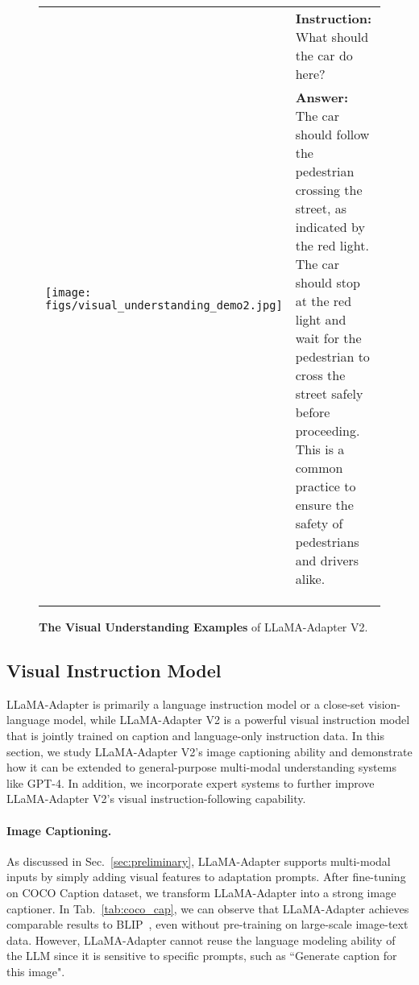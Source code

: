 \documentclass[10pt,twocolumn,letterpaper]{article}
\begin{document}
\begin{figure*}[th]
{\begin{tabular}{ll}
\multirow{2}{*}{
\texttt{[image: figs/visual\_understanding\_demo2.jpg]}
} & \begin{minipage}[t]{\columnwidth}
\textbf{Instruction:} What should the car do here?\end{minipage}\\
& \begin{minipage}[t]{\columnwidth}\textbf{Answer:} The car should follow the pedestrian crossing the street, as indicated by the red light. The car should stop at the red light and wait for the pedestrian to cross the street safely before proceeding. This is a common practice to ensure the safety of pedestrians and drivers alike. \end{minipage} \\ \\ \\ \\ 



\end{tabular}}
\caption{\textbf{The Visual Understanding Examples} of LLaMA-Adapter V2.}
\label{tab:visual_understanding}
\end{figure*} 
\subsection{Visual Instruction Model}

LLaMA-Adapter is primarily a language instruction model or a close-set vision-language model, while LLaMA-Adapter V2 is a powerful visual instruction model that is jointly trained on caption and language-only instruction data.
In this section, we study LLaMA-Adapter V2's image captioning ability and demonstrate how it can be extended to general-purpose multi-modal understanding systems like GPT-4. In addition, we incorporate expert systems to further improve LLaMA-Adapter V2's visual instruction-following capability.


\paragraph{Image Captioning.}
As discussed in Sec.~\ref{sec:preliminary}, LLaMA-Adapter supports multi-modal inputs by simply adding visual features to adaptation prompts. After fine-tuning on COCO Caption dataset, we transform LLaMA-Adapter into a strong image captioner. 
In Tab.~\ref{tab:coco_cap}, we can observe that LLaMA-Adapter achieves comparable results to BLIP~\cite{li2022blip,li2023blip}, even without pre-training on large-scale image-text data. However, LLaMA-Adapter cannot reuse the language modeling ability of the LLM since it is sensitive to specific prompts, such as ``Generate caption for this image".
\end{document}
